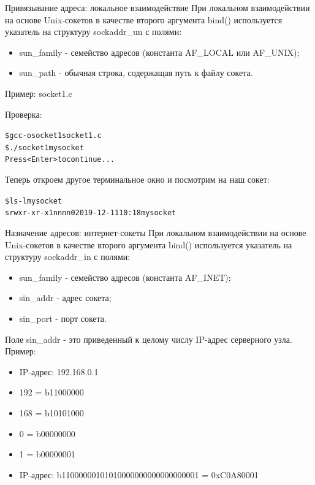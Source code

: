 \documentclass{beamer}
\begin{document}
\begin{frame}[fragile]{Привязывание адреса: локальное взаимодействие}
	При локальном взаимодействии на основе Unix-сокетов в качестве второго аргумента bind() используется указатель на структуру sockaddr\_un с полями: 
	\begin{itemize}
		\item sun\_family - семейство адресов (константа AF\_LOCAL или AF\_UNIX);
		\item sun\_path - обычная строка, содержащая путь к файлу сокета.
	\end{itemize}
	Пример: socket1.c
	
	Проверка:
	\begin{alltt}
		\$ gcc -o socket1 socket1.c
		\$ ./socket1 mysocket
		Press <Enter> to continue...
	\end{alltt}
	Теперь откроем другое терминальное окно и посмотрим на наш сокет:
	\begin{alltt}
		\$ ls -l mysocket
		srwxr-xr-x 1 nn nn 0 2019-12-11 10:18 mysocket
	\end{alltt}
\end{frame}

\begin{frame}[fragile]{Назначение адресов: интернет-сокеты}
	При локальном взаимодействии на основе Unix-сокетов в качестве второго аргумента bind() используется указатель на структуру sockaddr\_in с полями: 
	\begin{itemize}
		\item sun\_family - семейство адресов (константа AF\_INET);
		\item sin\_addr - адрес сокета;
		\item sin\_port - порт сокета.
	\end{itemize}
	Поле sin\_addr - это приведенный к целому числу IP-адрес серверного узла. Пример:
	\begin{itemize}
		\item IP-адрес: 192.168.0.1
		\item 192 = b11000000		
		\item 168 = b10101000		
		\item   0 = b00000000		
		\item   1 = b00000001						
		\item IP-адрес: b11000000101010000000000000000001 = 0xC0A80001
	\end{itemize}	
\end{frame}
\end{document}
